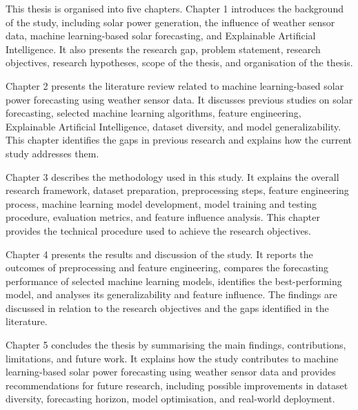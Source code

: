 This thesis is organised into five chapters. Chapter 1 introduces the background of the study, including solar power generation, the influence of weather sensor data, machine learning-based solar forecasting, and Explainable Artificial Intelligence. It also presents the research gap, problem statement, research objectives, research hypotheses, scope of the thesis, and organisation of the thesis.

Chapter 2 presents the literature review related to machine learning-based solar power forecasting using weather sensor data. It discusses previous studies on solar forecasting, selected machine learning algorithms, feature engineering, Explainable Artificial Intelligence, dataset diversity, and model generalizability. This chapter identifies the gaps in previous research and explains how the current study addresses them.

Chapter 3 describes the methodology used in this study. It explains the overall research framework, dataset preparation, preprocessing steps, feature engineering process, machine learning model development, model training and testing procedure, evaluation metrics, and feature influence analysis. This chapter provides the technical procedure used to achieve the research objectives.

Chapter 4 presents the results and discussion of the study. It reports the outcomes of preprocessing and feature engineering, compares the forecasting performance of selected machine learning models, identifies the best-performing model, and analyses its generalizability and feature influence. The findings are discussed in relation to the research objectives and the gaps identified in the literature.

Chapter 5 concludes the thesis by summarising the main findings, contributions, limitations, and future work. It explains how the study contributes to machine learning-based solar power forecasting using weather sensor data and provides recommendations for future research, including possible improvements in dataset diversity, forecasting horizon, model optimisation, and real-world deployment.






